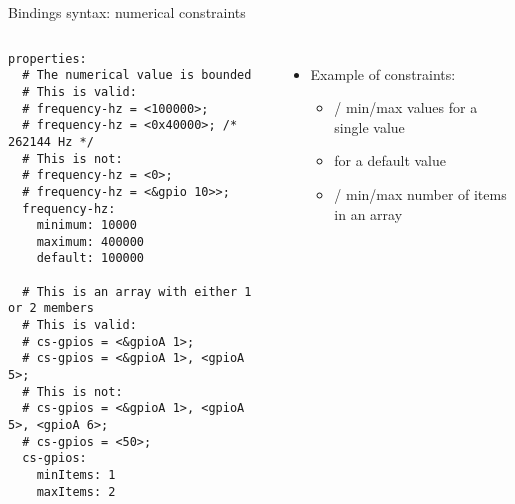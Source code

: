 \begin{frame}[fragile]{Bindings syntax: numerical constraints}
  \begin{columns}
    \begin{block}{}
      {\fontsize{5}{6}\selectfont
\begin{verbatim}
properties:
  # The numerical value is bounded
  # This is valid:
  # frequency-hz = <100000>;
  # frequency-hz = <0x40000>; /* 262144 Hz */
  # This is not:
  # frequency-hz = <0>;
  # frequency-hz = <&gpio 10>>;
  frequency-hz:
    minimum: 10000
    maximum: 400000
    default: 100000

  # This is an array with either 1 or 2 members
  # This is valid:
  # cs-gpios = <&gpioA 1>;
  # cs-gpios = <&gpioA 1>, <gpioA 5>;
  # This is not:
  # cs-gpios = <&gpioA 1>, <gpioA 5>, <gpioA 6>;
  # cs-gpios = <50>;
  cs-gpios:
    minItems: 1
    maxItems: 2
\end{verbatim}
      }
    \end{block}
    \begin{itemize}
    \item Example of constraints:
      \begin{itemize}
      \item {}/ min/max values for a
        single value
      \item {} for a default value
      \item {}/ min/max number of
        items in an array
      \end{itemize}
    \end{itemize}
  \end{columns}
\end{frame}

